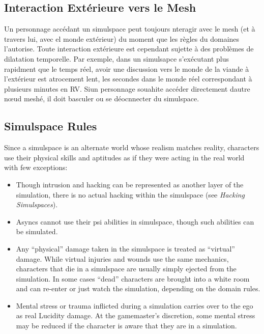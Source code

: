 \subsection{Interaction Extérieure vers le Mesh} 

Un personnage accédant un simulspace peut toujours nteragir avec le mesh (et à travers lui, avec el monde extérieur) du moment que les règles du domaines l'autorise. Toute interaction extérieure est cependant sujette à des problèmes de dilatation temporelle. Par exemple, dans un simulsapce s'exécutant plus rapidment que le temps réel, avoir une discussion vers le monde de la viande à l'extérieur est atrocement lent, les secondes dans le monde réel correspondant à plusieurs minutes en RV. Siun personnage souahite accéder directement dautre nœud meshé, il doit basculer ou se déocnnecter du simulspace. 

\subsection{Simulspace Rules} 

Since a simulspace is an alternate world whose realism matches reality, characters use their physical skills and aptitudes as if they were acting in the real world with few exceptions: \begin{itemize} \item Though intrusion and hacking can be represented as another layer of the simulation, there is no actual hacking within the simulspace (see \textit{Hacking Simulspaces}). 

\item Asyncs cannot use their psi abilities in simulspace, though such abilities can be simulated. 

\item Any ``physical'' damage taken in the simulspace is treated as ``virtual'' damage. While virtual injuries and wounds use the same mechanics, characters that die in a simulspace are usually simply ejected from the simulation. In some cases ``dead'' characters are brought into a white room and can re-enter or just watch the simulation, depending on the domain rules. 

\item Mental stress or trauma inflicted during a simulation carries over to the ego as real Lucidity damage. At the gamemaster's discretion, some mental stress may be reduced if the character is aware that they are in a simulation. \end{itemize} 



